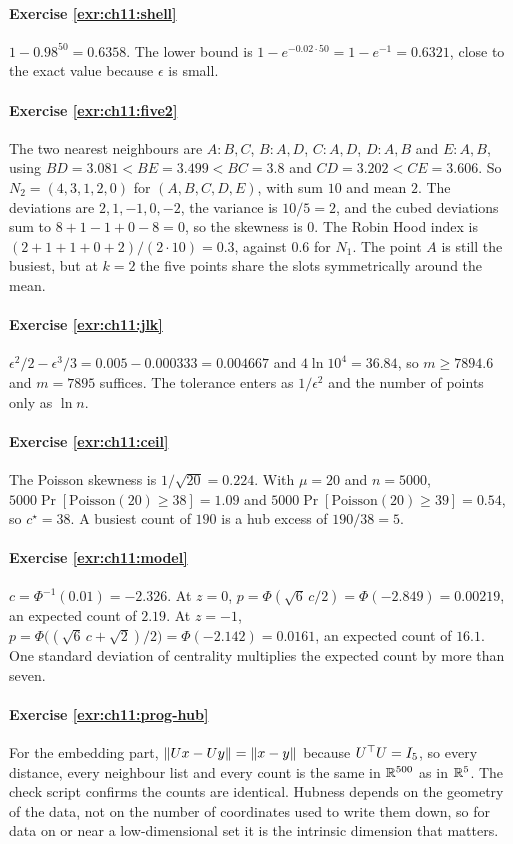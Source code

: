 \paragraph{Exercise \ref{exr:ch11:shell}}
$1-0.98^{50}=0.6358$. The lower bound is $1-e^{-0.02\cdot50}=1-e^{-1}=0.6321$, close
to the exact value because $\epsilon$ is small.

\paragraph{Exercise \ref{exr:ch11:five2}}
The two nearest neighbours are $A\colon B,C$, $B\colon A,D$, $C\colon A,D$,
$D\colon A,B$ and $E\colon A,B$, using $BD=3.081<BE=3.499<BC=3.8$ and
$CD=3.202<CE=3.606$. So $N_2=(4,3,1,2,0)$ for $(A,B,C,D,E)$, with sum $10$ and mean $2$.
The deviations are $2,1,-1,0,-2$, the variance is $10/5=2$, and the cubed deviations
sum to $8+1-1+0-8=0$, so the skewness is $0$. The Robin Hood index is
$(2+1+1+0+2)/(2\cdot10)=0.3$, against $0.6$ for $N_1$. The point $A$ is still the
busiest, but at $k=2$ the five points share the slots symmetrically around the mean.

\paragraph{Exercise \ref{exr:ch11:jlk}}
$\epsilon^2/2-\epsilon^3/3=0.005-0.000333=0.004667$ and $4\ln10^4=36.84$, so
$m\ge7894.6$ and $m=7895$ suffices. The tolerance enters as $1/\epsilon^2$ and the
number of points only as $\ln n$.

\paragraph{Exercise \ref{exr:ch11:ceil}}
The Poisson skewness is $1/\sqrt{20}=0.224$. With $\mu=20$ and $n=5000$,
$5000\Pr[\mathrm{Poisson}(20)\ge38]=1.09$ and $5000\Pr[\mathrm{Poisson}(20)\ge39]=0.54$,
so $c^\star=38$. A busiest count of $190$ is a hub excess of $190/38=5$.

\paragraph{Exercise \ref{exr:ch11:model}}
$c=\Phi^{-1}(0.01)=-2.326$. At $z=0$, $p=\Phi(\sqrt6\,c/2)=\Phi(-2.849)=0.00219$, an
expected count of $2.19$. At $z=-1$, $p=\Phi\big((\sqrt6\,c+\sqrt2)/2\big)=\Phi(-2.142)=0.0161$,
an expected count of $16.1$. One standard deviation of centrality multiplies the
expected count by more than seven.

\paragraph{Exercise \ref{exr:ch11:prog-hub}}
For the embedding part, $\lVert Ux-Uy\rVert=\lVert x-y\rVert$ because $U^{\top} U=I_5$, so every
distance, every neighbour list and every count is the same in $\mathbb{R}^{500}$ as in
$\mathbb{R}^5$. The check script confirms the counts are identical. Hubness depends on the
geometry of the data, not on the number of coordinates used to write them down, so
for data on or near a low-dimensional set it is the intrinsic dimension that matters.
